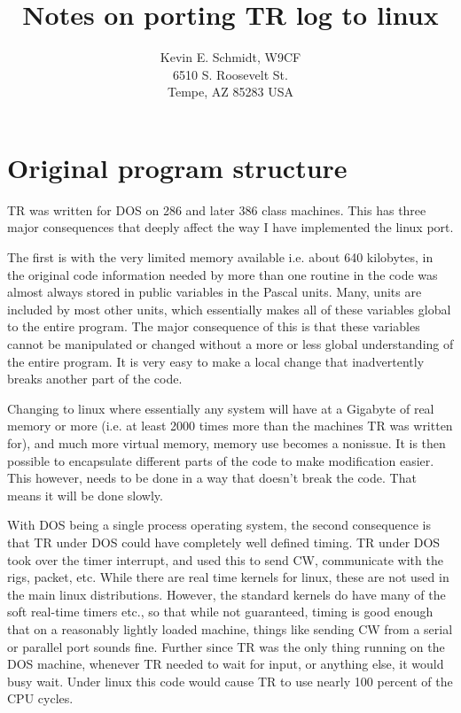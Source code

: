 \documentclass[12pt]{article}
\begin{document}
\title{Notes on porting TR log to linux}
\author{
Kevin E. Schmidt, W9CF\\
6510 S. Roosevelt St.\\
Tempe, AZ 85283 USA\\
}
\date{}
\maketitle
\section{Original program structure}
TR was written for DOS on 286 and later 386 class machines. This
has three major consequences that deeply affect the way I have
implemented the linux port.

The first is with the very limited
memory available i.e. about 640 kilobytes, in the original code
information needed by more than one routine in the code was almost
always stored in public variables in the Pascal units. Many, units
are included by most other units, which essentially makes all of these
variables global to the entire program.  The major consequence of this
is that these variables cannot be manipulated or changed without a
more or less global understanding of the entire program. It is very
easy to make a local change that inadvertently breaks another part of the
code.

Changing to linux where essentially any system will have at
a Gigabyte of real memory or more (i.e. at least 2000 times more than the
machines TR was written for),
and much more virtual memory, memory use becomes a nonissue. It is
then possible to encapsulate different parts of the code to make modification
easier. This however, needs to be done in a way that doesn't break the
code. That means it will be done slowly.

With DOS being a single process operating system, the second consequence is
that TR under DOS could have completely well defined timing. TR under DOS
took over the timer interrupt, and used this to send CW, communicate with
the rigs, packet, etc. While there are real time kernels for linux,
these are not used in the main linux distributions. However, the
standard kernels do have many of the soft real-time timers etc., so that
while not guaranteed, timing is good enough that on a reasonably
lightly loaded machine, things like sending CW from a serial or parallel
port sounds fine. Further since TR was the only thing running on the DOS
machine, whenever TR needed to wait for input, or anything else, it would
busy wait. Under linux this code would cause TR to use nearly 100 percent
of the CPU cycles.
\end{document}
